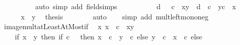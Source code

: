 \begin{isabellebody}
\ \ \ \ \ \ \ \ \isamarkupfalse%
\ {\isacharparenleft}{\kern0pt}auto\ simp\ add{\isacharcolon}{\kern0pt}\ field{\isacharunderscore}{\kern0pt}simps\ {}{\isacharparenright}{\kern0pt}\isanewline
\ \ \ \ \ \ \isamarkupfalse%
\ \isamarkupfalse%
\ {\isachardoublequoteopen}d\ {\isasymin}\ {\isacharparenleft}{\kern0pt}{\isacharasterisk}{\kern0pt}{\isacharparenright}{\kern0pt}\ c\ {\isacharbackquote}{\kern0pt}\ {\isacharbraceleft}{\kern0pt}x{\isachardot}{\kern0pt}{\isachardot}{\kern0pt}y{\isacharbraceright}{\kern0pt}\ {\isasymlongleftrightarrow}\ d\ {\isasymin}\ {\isacharbraceleft}{\kern0pt}c\ {\isacharasterisk}{\kern0pt}\ y{\isachardot}{\kern0pt}{\isachardot}{\kern0pt}c\ {\isacharasterisk}{\kern0pt}\ x{\isacharbraceright}{\kern0pt}{\isachardoublequoteclose}\ \isacommand{{\isachardot}{\kern0pt}}\isamarkupfalse%
\isanewline
\ \ \ \ \isamarkupfalse%
\isanewline
\ \ \ \ \isamarkupfalse%
\ {\isacartoucheopen}x\ {\isasymle}\ y{\isacartoucheclose}\ \isamarkupfalse%
\ {\isacharquery}{\kern0pt}thesis\isanewline
\ \ \ \ \ \ \isamarkupfalse%
\ auto\isanewline
\ \ \isamarkupfalse%
\ {\isacharparenleft}{\kern0pt}simp\ add{\isacharcolon}{\kern0pt}\ mult{\isacharunderscore}{\kern0pt}left{\isacharunderscore}{\kern0pt}mono{\isacharunderscore}{\kern0pt}neg{\isacharparenright}{\kern0pt}\isanewline
{}\isamarkupfalse%
%
\endisatagproof
{\isafoldproof}%
%
\isadelimproof
\isanewline
%
\endisadelimproof
\isanewline
{}\isamarkupfalse%
\ image{\isacharunderscore}{\kern0pt}mult{\isacharunderscore}{\kern0pt}atLeastAtMost{\isacharunderscore}{\kern0pt}if{\isacharprime}{\kern0pt}{\isacharcolon}{\kern0pt}\isanewline
\ \ {\isachardoublequoteopen}{\isacharparenleft}{\kern0pt}{\isasymlambda}x{\isachardot}{\kern0pt}\ x\ {\isacharasterisk}{\kern0pt}\ c{\isacharparenright}{\kern0pt}\ {\isacharbackquote}{\kern0pt}\ {\isacharbraceleft}{\kern0pt}x{\isachardot}{\kern0pt}{\isachardot}{\kern0pt}y{\isacharbraceright}{\kern0pt}\ {\isacharequal}{\kern0pt}\isanewline
\ \ \ \ {\isacharparenleft}{\kern0pt}if\ x\ {\isasymle}\ y\ then\ if\ c\ {\isachargreater}{\kern0pt}\ {}\ then\ {\isacharbraceleft}{\kern0pt}x\ {\isacharasterisk}{\kern0pt}\ c\ {\isachardot}{\kern0pt}{\isachardot}{\kern0pt}\ y\ {\isacharasterisk}{\kern0pt}\ c{\isacharbraceright}{\kern0pt}\ else\ {\isacharbraceleft}{\kern0pt}y\ {\isacharasterisk}{\kern0pt}\ c\ {\isachardot}{\kern0pt}{\isachardot}{\kern0pt}\ x\ {\isacharasterisk}{\kern0pt}\ c{\isacharbraceright}{\kern0pt}\ else\ {\isacharbraceleft}{\kern0pt}{\isacharbraceright}{\kern0pt}{\isacharparenright}{\kern0pt}{\isachardoublequoteclose}\isanewline

\end{isabellebody}
